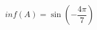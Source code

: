 \documentclass[preview]{standalone}
\begin{document}
\begin{align*}
inf(A) = \sin\left(-\dfrac{4\pi}{7}\right)
\end{align*}
\end{document}
